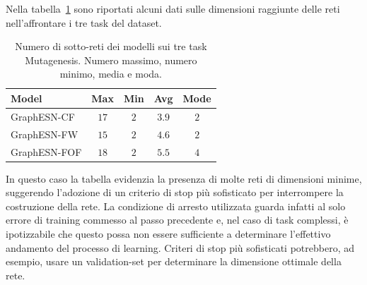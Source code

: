Nella tabella~\ref{tab:dimensioni:mutag} sono riportati alcuni dati sulle dimensioni raggiunte delle reti nell'affrontare i tre task del dataset.
\begin{table}
\small
\caption[Dimensioni delle reti su Mutagenesis]{Numero di sotto-reti dei modelli sui tre task Mutagenesis. Numero massimo, numero minimo, media e moda.}
\label{tab:dimensioni:mutag} 
\centering	
\begin{tabular}{l*{4}{c}}
\toprule
Model 		 & Max & Min & Avg & Mode \\
\midrule
GraphESN-CF  & $17$ & $2$ & $3.9$ & $2$ \\
GraphESN-FW  & $15$ & $2$ & $4.6$ & $2$ \\
GraphESN-FOF & $18$ & $2$ & $5.5$ & $4$ \\
\bottomrule
\end{tabular}
\end{table}
In questo caso la tabella evidenzia la presenza di molte reti di dimensioni minime, suggerendo l'adozione di un criterio di stop più sofisticato per interrompere la costruzione della rete. La condizione di arresto utilizzata guarda infatti al solo errore di training commesso al passo precedente e, nel caso di task complessi, è ipotizzabile che questo possa non essere sufficiente a determinare l'effettivo andamento del processo di learning. Criteri di stop più sofisticati potrebbero, ad esempio, usare un validation-set per determinare la dimensione ottimale della rete.

